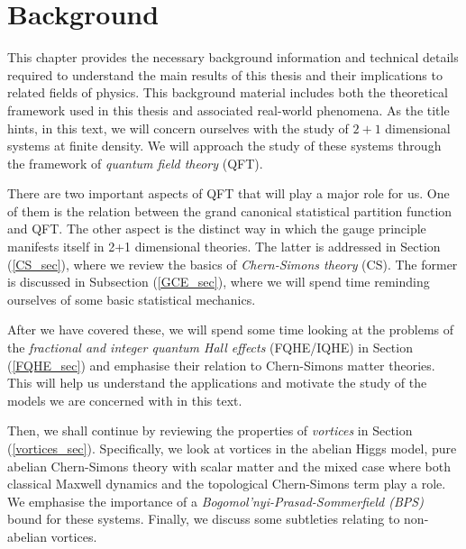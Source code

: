 
    \graphicspath{{Background_Folder/figures/PNG/}{Background_Folder/figures/PDF/}{Background_Folder/figures/}}

\chapter{Background} \label{ch:Background}
This chapter provides the necessary background information and technical details required to understand the main results of this thesis and their implications to related fields of physics. This background material includes both the theoretical framework used in this thesis and associated real-world phenomena. As the title hints, in this text, we will concern ourselves with the study of $2+1$ dimensional systems at finite density. We will approach the study of these systems through the framework of \textit{quantum field theory} (QFT). 

    There are two important aspects of QFT that will play a major role for us. One of them is the relation between the grand canonical statistical partition function and QFT. The other aspect is the distinct way in which the gauge principle manifests itself in 2+1 dimensional theories. The latter is addressed in Section (\ref{CS_sec}), where we review the basics of \textit{Chern-Simons theory} (CS). The former is discussed in Subsection (\ref{GCE_sec}), where we will spend time reminding ourselves of some basic statistical mechanics. 


    After we have covered these, we will spend some time looking at the problems of the \textit{fractional and integer quantum Hall effects} (FQHE/IQHE) in Section (\ref{FQHE_sec}) and emphasise their relation to Chern-Simons matter theories. This will help us understand the applications and motivate the study of the models we are concerned with in this text.

    Then, we shall continue by reviewing the properties of \textit{vortices} in Section (\ref{vortices_sec}). Specifically, we look at vortices in the abelian Higgs model, pure abelian Chern-Simons theory with scalar matter and the mixed case where both classical Maxwell dynamics and the topological Chern-Simons term play a role. We emphasise the importance of a \textit{Bogomol'nyi-Prasad-Sommerfield (BPS)} \cite{Bogomolny:1975de, Prasad:1975kr} bound for these systems. Finally, we discuss some subtleties relating to non-abelian vortices.

